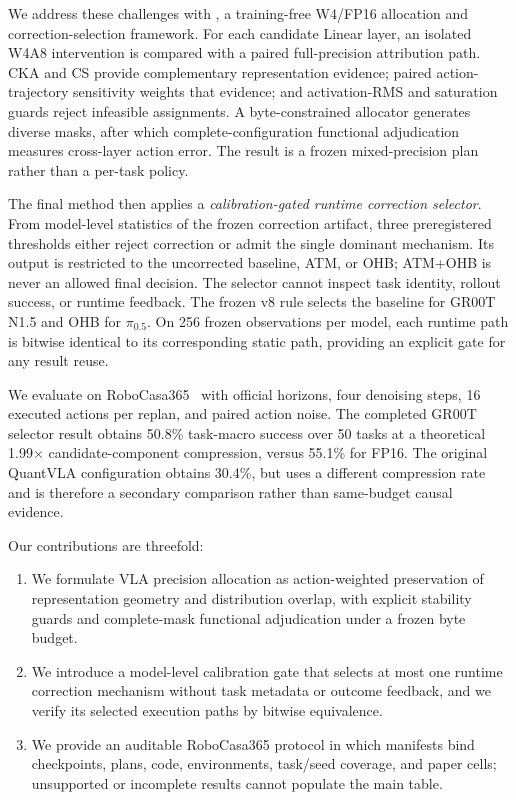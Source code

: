 We address these challenges with \method, a training-free W4/FP16 allocation and correction-selection framework. For each candidate Linear layer, an isolated W4A8 intervention is compared with a paired full-precision attribution path. CKA and CS provide complementary representation evidence; paired action-trajectory sensitivity weights that evidence; and activation-RMS and saturation guards reject infeasible assignments. A byte-constrained allocator generates diverse masks, after which complete-configuration functional adjudication measures cross-layer action error. The result is a frozen mixed-precision plan rather than a per-task policy.

The final method then applies a \emph{calibration-gated runtime correction selector}. From model-level statistics of the frozen correction artifact, three preregistered thresholds either reject correction or admit the single dominant mechanism. Its output is restricted to the uncorrected baseline, ATM, or OHB; ATM+OHB is never an allowed final decision. The selector cannot inspect task identity, rollout success, or runtime feedback. The frozen v8 rule selects the baseline for GR00T N1.5 and OHB for $\pi_{0.5}$. On 256 frozen observations per model, each runtime path is bitwise identical to its corresponding static path, providing an explicit gate for any result reuse.

We evaluate on RoboCasa365~\cite{nasiriany2026robocasa365} with official horizons, four denoising steps, 16 executed actions per replan, and paired action noise. The completed GR00T selector result obtains 50.8\% task-macro success over 50 tasks at a theoretical 1.99$\times$ candidate-component compression, versus 55.1\% for FP16. The original QuantVLA configuration obtains 30.4\%, but uses a different compression rate and is therefore a secondary comparison rather than same-budget causal evidence. \IntroEvidenceStatus

Our contributions are threefold:
\begin{enumerate}[(1)]
    \item We formulate VLA precision allocation as action-weighted preservation of representation geometry and distribution overlap, with explicit stability guards and complete-mask functional adjudication under a frozen byte budget.
    \item We introduce a model-level calibration gate that selects at most one runtime correction mechanism without task metadata or outcome feedback, and we verify its selected execution paths by bitwise equivalence.
    \item We provide an auditable RoboCasa365 protocol in which manifests bind checkpoints, plans, code, environments, task/seed coverage, and paper cells; unsupported or incomplete results cannot populate the main table.
\end{enumerate}
